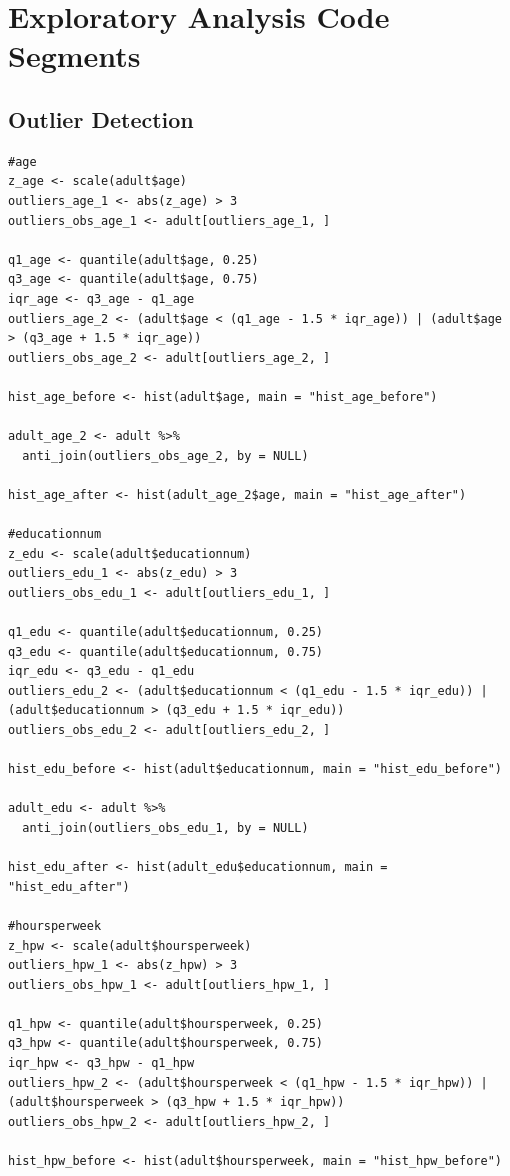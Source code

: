 \documentclass{article}
\begin{document}
\section{Exploratory Analysis Code Segments}

\subsection{Outlier Detection}
\begin{verbatim}
#age
z_age <- scale(adult$age)
outliers_age_1 <- abs(z_age) > 3
outliers_obs_age_1 <- adult[outliers_age_1, ]

q1_age <- quantile(adult$age, 0.25)
q3_age <- quantile(adult$age, 0.75)
iqr_age <- q3_age - q1_age
outliers_age_2 <- (adult$age < (q1_age - 1.5 * iqr_age)) | (adult$age > (q3_age + 1.5 * iqr_age))
outliers_obs_age_2 <- adult[outliers_age_2, ]

hist_age_before <- hist(adult$age, main = "hist_age_before")

adult_age_2 <- adult %>%
  anti_join(outliers_obs_age_2, by = NULL)

hist_age_after <- hist(adult_age_2$age, main = "hist_age_after")

#educationnum
z_edu <- scale(adult$educationnum)
outliers_edu_1 <- abs(z_edu) > 3
outliers_obs_edu_1 <- adult[outliers_edu_1, ]

q1_edu <- quantile(adult$educationnum, 0.25)
q3_edu <- quantile(adult$educationnum, 0.75)
iqr_edu <- q3_edu - q1_edu
outliers_edu_2 <- (adult$educationnum < (q1_edu - 1.5 * iqr_edu)) | (adult$educationnum > (q3_edu + 1.5 * iqr_edu))
outliers_obs_edu_2 <- adult[outliers_edu_2, ]

hist_edu_before <- hist(adult$educationnum, main = "hist_edu_before") 

adult_edu <- adult %>%
  anti_join(outliers_obs_edu_1, by = NULL)

hist_edu_after <- hist(adult_edu$educationnum, main = "hist_edu_after") 

#hoursperweek
z_hpw <- scale(adult$hoursperweek)
outliers_hpw_1 <- abs(z_hpw) > 3
outliers_obs_hpw_1 <- adult[outliers_hpw_1, ]

q1_hpw <- quantile(adult$hoursperweek, 0.25)
q3_hpw <- quantile(adult$hoursperweek, 0.75)
iqr_hpw <- q3_hpw - q1_hpw
outliers_hpw_2 <- (adult$hoursperweek < (q1_hpw - 1.5 * iqr_hpw)) | (adult$hoursperweek > (q3_hpw + 1.5 * iqr_hpw))
outliers_obs_hpw_2 <- adult[outliers_hpw_2, ]

hist_hpw_before <- hist(adult$hoursperweek, main = "hist_hpw_before")


\end{verbatim}
\end{document}
